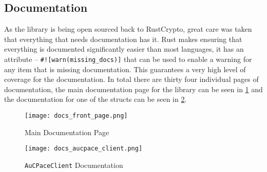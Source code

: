 \subsection{Documentation}
As the library is being open sourced back to RustCrypto, great care was taken that everything that needs documentation has it.
Rust makes ensuring that everything is documented significantly easier than most languages, it has an attribute -- \verb|#![warn(missing_docs)]| that can be used to enable a warning for any item that is missing documentation.
This guarantees a very high level of coverage for the documentation.
In total there are thirty four individual pages of documentation, the main documentation page for the library can be seen in \cref{fig:main-doc-page} and the documentation for one of the structs can be seen in \cref{fig:aucpace-client-doc-page}.

\begin{figure}[H]
  \centering

  \texttt{[image: docs\_front\_page.png]}
  \caption{Main Documentation Page}
  \label{fig:main-doc-page}
\end{figure}

\begin{figure}[H]
  \centering

  \texttt{[image: docs\_aucpace\_client.png]}
  \caption{\texttt{AuCPaceClient} Documentation}
  \label{fig:aucpace-client-doc-page}
\end{figure}
